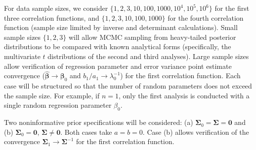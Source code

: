 \documentclass[11pt, oneside]{article}   	%
\begin{document}
For data sample sizes, we consider $\{ 1,2,3,10,100,1000,10^4,10^5,10^6\}$ for the first three correlation functions, and $\{ 1,2,3,10,100,1000\}$ for the fourth correlation function (sample size limited by inverse and determinant calculations).  Small sample sizes $\{ 1,2,3 \}$ will allow MCMC sampling from heavy-tailed posterior distributions to be compared with known analytical forms (specifically, the multivariate $t$ distributions of the second and third analyses).  Large sample sizes allow verification of regression parameter and error variance point estimate convergence ($\hat{\mathbf{\beta}} \rightarrow \mathbf{\beta}_0$ and $b_1/a_1 \rightarrow \lambda_0^{-1}$) for the first correlation function.  Each case will be structured so that the number of random parameters does not exceed the sample size.  For example, if $n=1$, only the first analysis is conducted with a single random regression parameter $\beta_0$.

Two noninformative prior specifications will be considered:  (a) $\mathbf{\Sigma}_0 = \mathbf{\Sigma} = \mathbf{0}$ and (b) $\mathbf{\Sigma}_0 = \mathbf{0}$, $\mathbf{\Sigma} \ne \mathbf{0}$.  Both cases take $a = b = 0$.  Case (b) allows verification of the convergence $\mathbf{\Sigma}_1 \rightarrow \mathbf{\Sigma}^{-1}$ for the first correlation function.
\end{document}
